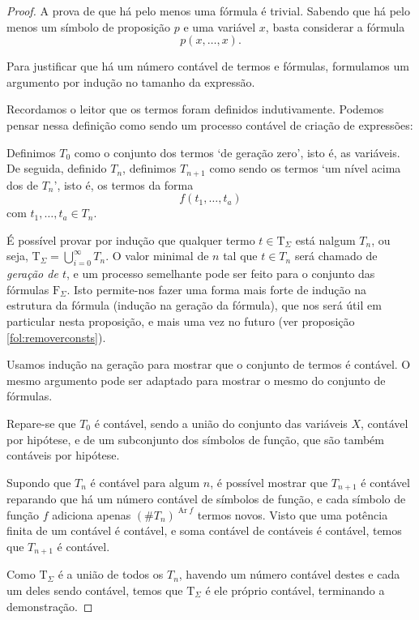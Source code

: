 \documentclass{report}
\theoremstyle{definition}
\theoremstyle{remark}
\newcommand{\F}{\mathrm{F}}
\newcommand{\T}{\mathrm{T}}
\DeclareMathOperator{\ar}{Ar}
\begin{document}
	\begin{proof}
	A prova de que há pelo menos uma fórmula é trivial. Sabendo que há pelo menos um símbolo de proposição $p$ e uma variável $x$, basta considerar a fórmula
	\[p(x, \dots, x).\]
	
	Para justificar que há um número contável de termos e fórmulas, formulamos um argumento por indução no tamanho da expressão.
	
	Recordamos o leitor que os termos foram definidos indutivamente. Podemos pensar nessa definição como sendo um processo contável de criação de expressões:
	
	Definimos $T_0$ como o conjunto dos termos `de geração zero', isto é, as variáveis. De seguida, definido $T_n$, definimos $T_{n+1}$ como sendo os termos `um nível acima dos de $T_n$', isto é, os termos da forma
	\[f(t_1, \dots, t_a)\]
	com $t_1, \dots, t_a \in T_n$.
	
	É possível provar por indução que qualquer termo $t \in \T_\Sigma$ está nalgum $T_n$, ou seja, $\T_\Sigma = \bigcup_{i = 0}^\infty T_n$. O valor minimal de $n$ tal que $t \in T_n$ será chamado de \emph{geração de $t$}, e um processo semelhante pode ser feito para o conjunto das fórmulas $\F_\Sigma$. Isto permite-nos fazer uma forma mais forte de indução na estrutura da fórmula (indução na geração da fórmula), que nos será útil em particular nesta proposição, e mais uma vez no futuro (ver proposição \ref{fol:removerconsts}).
	
	Usamos indução na geração para mostrar que o conjunto de termos é contável. O mesmo argumento pode ser adaptado para mostrar o mesmo do conjunto de fórmulas.
	
	Repare-se que $T_0$ é contável, sendo a união do conjunto das variáveis $X$, contável por hipótese, e de um subconjunto dos símbolos de função, que são também contáveis por hipótese.
	
	Supondo que $T_n$ é contável para algum $n$, é possível mostrar que $T_{n+1}$ é contável reparando que há um número contável de símbolos de função, e cada símbolo de função $f$ adiciona apenas $(\# T_n)^{\ar f}$ termos novos. Visto que uma potência finita de um contável é contável, e soma contável de contáveis é contável, temos que $T_{n+1}$ é contável.
	
	Como $\T_\Sigma$ é a união de todos os $T_n$, havendo um número contável destes e cada um deles sendo contável, temos que $\T_\Sigma$ é ele próprio contável, terminando a demonstração.
	\end{proof}
	
\end{document}
